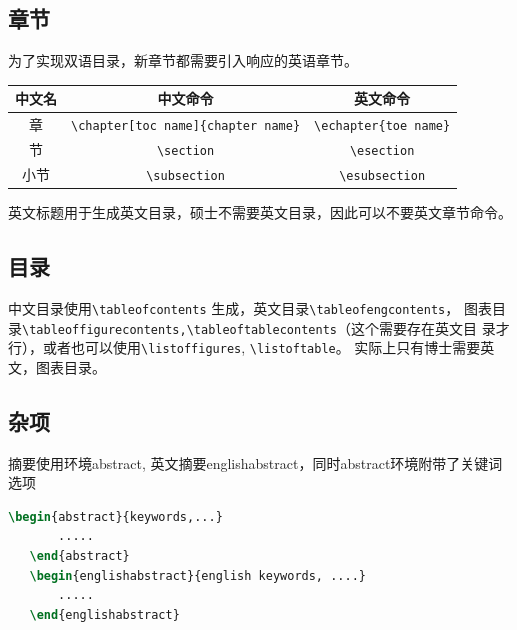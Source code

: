 \subsection{章节}
%
\label{sub:chapter-section}
为了实现双语目录，新章节都需要引入响应的英语章节。
\begin{table}[h]
    \centering
    \begin{tabular*}{0.85\textwidth}{@{\extracolsep{\fill}}ccc}
	\hline
     中文名& 中文命令 & 英文命令 \\ \hline
     章 & \verb|\chapter[toc name]{chapter name}| & \verb|\echapter{toe name}| \\ \hline
     节 & \verb|\section| & \verb|\esection| \\ \hline
     小节 & \verb|\subsection| & \verb|\esubsection| \\ \hline
    \end{tabular*}
\end{table}
英文标题用于生成英文目录，硕士不需要英文目录，因此可以不要英文章节命令。

\subsection{目录}
%
\label{sub:contents}
中文目录使用\verb|\tableofcontents| 生成，英文目录\verb|\tableofengcontents|，
图表目录\verb|\tableoffigurecontents,\tableoftablecontents|（这个需要存在英文目
录才行），或者也可以使用\verb|\listoffigures|, \verb|\listoftable|。
实际上只有博士需要英文，图表目录。

\subsection{杂项}
%
\label{sub:others}
摘要使用环境abstract, 英文摘要englishabstract，同时abstract环境附带了关键词选项
\begin{lstlisting}[language=TeX]
   \begin{abstract}{keywords,...}
       .....
   \end{abstract} 
   \begin{englishabstract}{english keywords, ....}
       .....
   \end{englishabstract}
\end{lstlisting}

